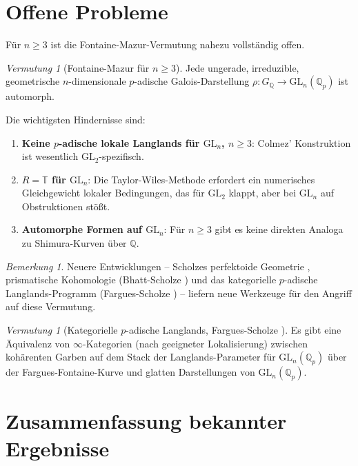 \documentclass[12pt,a4paper]{amsart}
\theoremstyle{definition}
\theoremstyle{remark}
\newtheorem{bemerkung}[theorem]{Bemerkung}
\newtheorem{vermutung}[theorem]{Vermutung}
\newcommand{\GL}{\mathrm{GL}}
\newcommand{\Qp}{\mathbb{Q}_p}
\newcommand{\GQ}{G_{\mathbb{Q}}}
\newcommand{\Q}{\mathbb{Q}}
\begin{document}
\section{Offene Probleme}\label{sec:offene_probleme}

Für $n \geq 3$ ist die Fontaine-Mazur-Vermutung nahezu vollständig offen.

\begin{vermutung}[Fontaine-Mazur für $n \geq 3$]\label{verm:FMn3}
  Jede ungerade, irreduzible, geometrische $n$-dimensionale $p$-adische Galois-Darstellung
  $\rho\colon \GQ \to \GL_n(\Qp)$ ist automorph.
\end{vermutung}

Die wichtigsten Hindernisse sind:
\begin{enumerate}[label=(\roman*)]
  \item \textbf{Keine $p$-adische lokale Langlands für $\GL_n$, $n \geq 3$}:
    Colmez' Konstruktion ist wesentlich $\GL_2$-spezifisch.
  \item \textbf{$R = \mathbb{T}$ für $\GL_n$}: Die Taylor-Wiles-Methode erfordert
    ein numerisches Gleichgewicht lokaler Bedingungen, das für $\GL_2$ klappt,
    aber bei $\GL_n$ auf Obstruktionen stößt.
  \item \textbf{Automorphe Formen auf $\GL_n$}: Für $n \geq 3$ gibt es keine direkten
    Analoga zu Shimura-Kurven über $\Q$.
\end{enumerate}

\begin{bemerkung}
  Neuere Entwicklungen -- Scholzes perfektoide Geometrie \cite{Scholze2015},
  prismatische Kohomologie (Bhatt-Scholze \cite{BS2022}) und das kategorielle
  $p$-adische Langlands-Programm (Fargues-Scholze \cite{FS2021}) -- liefern neue Werkzeuge
  für den Angriff auf diese Vermutung.
\end{bemerkung}

\begin{vermutung}[Kategorielle $p$-adische Langlands, Fargues-Scholze \cite{FS2021}]
  Es gibt eine Äquivalenz von $\infty$-Kategorien (nach geeigneter Lokalisierung)
  zwischen kohärenten Garben auf dem Stack der Langlands-Parameter für $\GL_n(\Qp)$
  über der Fargues-Fontaine-Kurve und glatten Darstellungen von $\GL_n(\Qp)$.
\end{vermutung}

\section{Zusammenfassung bekannter Ergebnisse}
\end{document}
